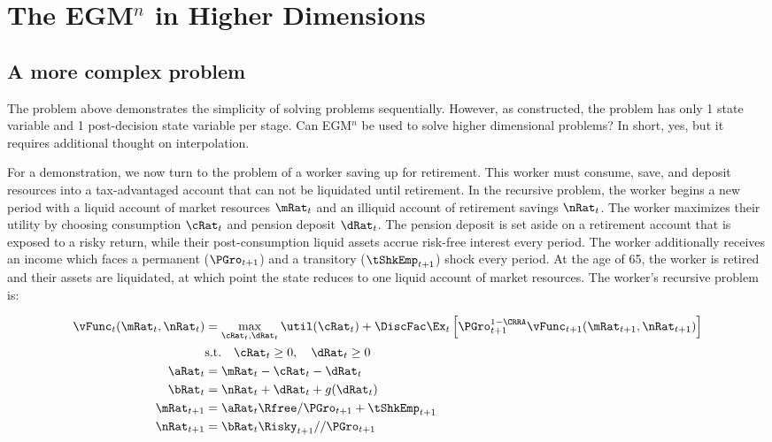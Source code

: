 \documentclass[\econtexRoot/SequentialEGM]{subfiles}
\begin{document}
\hypertarget{higher-dimensions}{}
\par\section{The EGM$^n$ in Higher Dimensions}
\notinsubfile{\label{sec:higherdims}}

\subsection{A more complex problem}

The problem above demonstrates the simplicity of solving problems sequentially. However, as constructed, the problem has only 1 state variable and 1 post-decision state variable per stage. Can EGM$^n$ be used to solve higher dimensional problems? In short, yes, but it requires additional thought on interpolation.

For a demonstration, we now turn to the problem of a worker saving up for retirement. This worker must consume, save, and deposit resources into a tax-advantaged account that can not be liquidated until retirement. In the recursive problem, the worker begins a new period with a liquid account of market resources $\mRat_{t}$ and an illiquid account of retirement savings $\nRat_{t}$. The worker maximizes their utility by choosing consumption $\cRat_{t}$ and pension deposit $\dRat_{t}$. The pension deposit is set aside on a retirement account that is exposed to a risky return, while their post-consumption liquid assets accrue risk-free interest every period. The worker additionally receives an income which faces a permanent ($\PGro_{t+1}$) and a transitory ($\tShkEmp_{t+1}$) shock every period. At the age of 65, the worker is retired and their assets are liquidated, at which point the state reduces to one liquid account of market resources. The worker's recursive problem is:

\begin{equation}
        \begin{split}
                \vFunc_{t}(\mRat_{t}, \nRat_{t}) & = \max_{\cRat_{t}, \dRat_{t}} \util(\cRat_{t}) + \DiscFac \Ex_{t} \left[ \PGro_{t+1}^{1-\CRRA} \vFunc_{t+1}(\mRat_{t+1}, \nRat_{t+1}) \right] \\
                & \text{s.t.} \quad \cRat_{t} \ge 0, \quad \dRat_{t} \ge 0 \\
                \aRat_{t} & = \mRat_{t} - \cRat_{t} - \dRat_{t} \\
                \bRat_{t} & = \nRat_{t} + \dRat_{t} + g(\dRat_{t}) \\
                \mRat_{t+1} & = \aRat_{t} \Rfree / \PGro_{t+1}  + \tShkEmp_{t+1} \\
                \nRat_{t+1} & = \bRat_{t} \Risky_{t+1} / / \PGro_{t+1}
        \end{split}
\end{equation}
\end{document}
